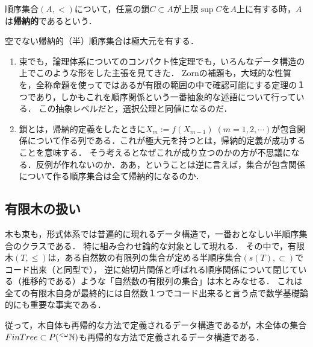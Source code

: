 \documentclass[uplatex, 12pt, dvipdfmx]{jsreport}
\begin{document}
\begin{definition}
    順序集合$(A,<)$について，任意の鎖$C\subset A$が上限$\sup C$を$A$上に有する時，$A$は\textbf{帰納的}であるという．
\end{definition}
\begin{lemma}
    空でない帰納的（半）順序集合は極大元を有する．
\end{lemma}
\begin{remark}\mbox{}
    \begin{enumerate}
        \item 束でも，論理体系についてのコンパクト性定理でも，いろんなデータ構造の上でこのような形をした主張を見てきた．
        Zornの補題も，大域的な性質を，全称命題を使ってではあるが有限の範囲の中で確認可能にする定理の１つであり，しかもこれを順序関係という一番抽象的な述語について行っている．
        この抽象レベルだと，選択公理と同値になるのだ．
        \item 鎖とは，帰納的定義をしたときに$X_m:=f(X_{m-1})\;(m=1,2,\cdots)$が包含関係について作る列である．これが極大元を持つとは，帰納的定義が成功することを意味する．
        そう考えるとなぜこれが成り立つのかの方が不思議になる．反例が作れないのか．ああ，ということは逆に言えば，集合が包含関係について作る順序集合は全て帰納的になるのか．
    \end{enumerate}
\end{remark}

\subsection{有限木の扱い}

\begin{screen}
    木も束も，形式体系では普遍的に現れるデータ構造で，一番おとなしい半順序集合のクラスである．
    特に組み合わせ論的な対象として現れる．
    その中で，有限木$(T,\le)$は，ある自然数の有限列の集合が定める半順序集合$(s(T),\subset)$で
    コード出来（と同型で），
    逆に始切片関係と呼ばれる順序関係について閉じている（推移的である）ような「自然数の有限列の集合」は木とみなせる．
    これは全ての有限木自身が最終的には自然数１つでコード出来ると言う点で数学基礎論的にも重要な事実である．

    従って，木自体も再帰的な方法で定義されるデータ構造であるが，木全体の集合$FinTree\subset P({}^{<\omega}\mathbb{N})$も再帰的な方法で定義されるデータ構造である．
\end{screen}
\end{document}
